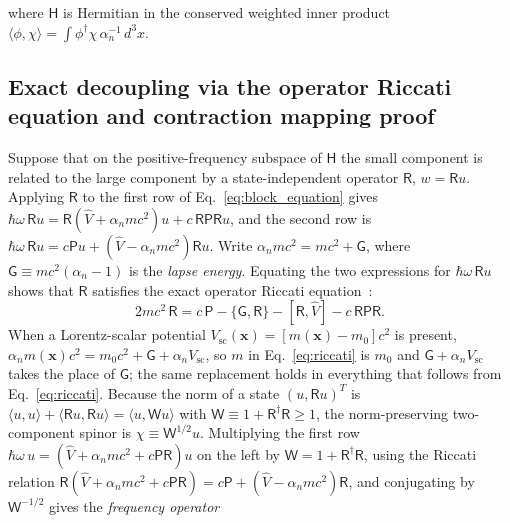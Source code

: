 \documentclass[aps,prd,onecolumn,tightenlines,nofootinbib,notitlepage,11pt,floatfix]{revtex4-2}
\theoremstyle{indentedtheorem}
\begin{document}
where $\mathsf{H}$ is Hermitian in the conserved weighted inner product $\langle\phi,\chi\rangle = \int\phi^\dagger\chi\,\alpha_n^{-1}\,d^3x$.

\subsection{Exact decoupling via the operator Riccati equation and contraction mapping proof}
\label{sec:riccati_decoupling}

Suppose that on the positive-frequency subspace of $\mathsf{H}$ the small component is related to the large component by a state-independent operator $\mathsf{R}$, $w = \mathsf{R}u$. Applying $\mathsf{R}$ to the first row of Eq.~\eqref{eq:block_equation} gives $\hbar\omega\,\mathsf{R}u = \mathsf{R}(\hat{V}+\alpha_nmc^2)u + c\,\mathsf{R}\mathsf{P}\mathsf{R}u$, and the second row is $\hbar\omega\,\mathsf{R}u = c\mathsf{P}u + (\hat{V}-\alpha_nmc^2)\mathsf{R}u$. Write $\alpha_nmc^2 = mc^2 + \mathsf{G}$, where $\mathsf{G} \equiv mc^2(\alpha_n-1)$ is the \emph{lapse energy}. Equating the two expressions for $\hbar\omega\,\mathsf{R}u$ shows that $\mathsf{R}$ satisfies the exact operator Riccati equation~\citep{Heully1986Diagonalisation,KutzelniggLiu2005Quasirelativistic}:
\begin{equation}
    2mc^2\,\mathsf{R} = c\,\mathsf{P} - \{\mathsf{G},\mathsf{R}\} - [\mathsf{R},\hat{V}] - c\,\mathsf{R}\mathsf{P}\mathsf{R} .
    \label{eq:riccati}
\end{equation}
When a Lorentz-scalar potential $V_\text{sc}(\mathbf{x}) = [m(\mathbf{x})-m_0]c^2$ is present, $\alpha_n m(\mathbf{x})c^2 = m_0c^2 + \mathsf{G} + \alpha_n V_\text{sc}$, so $m$ in Eq.~\eqref{eq:riccati} is $m_0$ and $\mathsf{G}+\alpha_nV_\text{sc}$ takes the place of $\mathsf{G}$; the same replacement holds in everything that follows from Eq.~\eqref{eq:riccati}. Because the norm of a state $(u,\mathsf{R}u)^T$ is $\langle u,u\rangle + \langle\mathsf{R}u,\mathsf{R}u\rangle = \langle u,\mathsf{W}u\rangle$ with $\mathsf{W} \equiv 1 + \mathsf{R}^\dagger\mathsf{R} \ge 1$, the norm-preserving two-component spinor is $\chi \equiv \mathsf{W}^{1/2}u$. Multiplying the first row $\hbar\omega\,u = (\hat{V}+\alpha_nmc^2+c\mathsf{P}\mathsf{R})u$ on the left by $\mathsf{W}=1+\mathsf{R}^\dagger\mathsf{R}$, using the Riccati relation $\mathsf{R}(\hat{V}+\alpha_nmc^2+c\mathsf{P}\mathsf{R}) = c\mathsf{P} + (\hat{V}-\alpha_nmc^2)\mathsf{R}$, and conjugating by $\mathsf{W}^{-1/2}$ gives the \emph{frequency operator}
\end{document}

